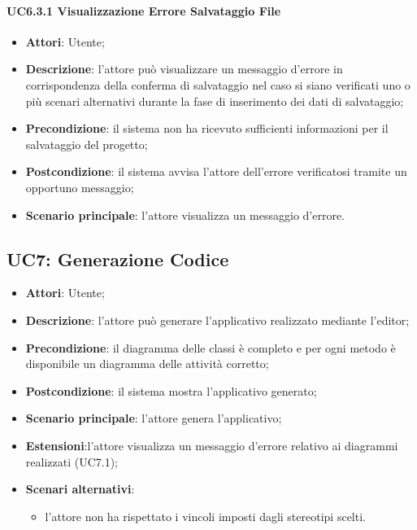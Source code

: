 \paragraph{UC6.3.1 Visualizzazione Errore Salvataggio File}
\begin{itemize}
\item \textbf{Attori}: Utente;
\item \textbf{Descrizione}: l'attore può visualizzare un messaggio d'errore in corrispondenza della conferma di salvataggio nel caso si siano verificati uno o più scenari alternativi durante la fase di inserimento dei dati di salvataggio;	
\item \textbf{Precondizione}: il sistema non ha ricevuto sufficienti informazioni per il salvataggio del progetto;	
\item \textbf{Postcondizione}: il sistema avvisa l'attore dell'errore verificatosi tramite un opportuno messaggio;	
\item \textbf{Scenario principale}:
l'attore visualizza un messaggio d'errore.	
\end{itemize}

\subsection{UC7: Generazione Codice}
\label{UC7}
\begin{itemize}
\item \textbf{Attori}: Utente;
\item \textbf{Descrizione}: l'attore può generare l'applicativo realizzato mediante l'editor;
\item \textbf{Precondizione}: il diagramma delle classi è completo e per ogni metodo è disponibile un diagramma delle attività corretto;
\item \textbf{Postcondizione}: il sistema mostra l'applicativo generato;
\item \textbf{Scenario principale}:
l'attore genera l'applicativo;
\item \textbf{Estensioni}:l'attore visualizza un messaggio d'errore relativo ai diagrammi realizzati (UC7.1);
\item \textbf{Scenari alternativi}:
\begin{itemize}
\item l'attore non ha rispettato i vincoli imposti dagli stereotipi scelti.
\end{itemize}
\end{itemize}

